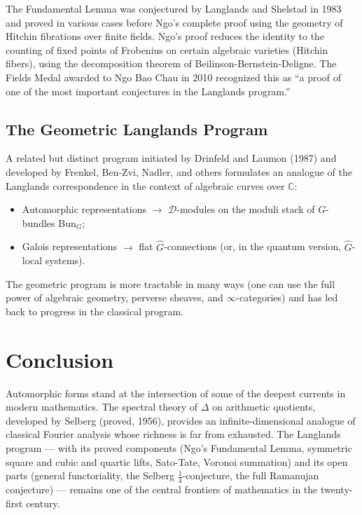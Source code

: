 \documentclass[12pt,a4paper]{amsart}
\theoremstyle{definition}
\newcommand{\CC}{\mathbb{C}}
\begin{document}
The Fundamental Lemma was conjectured by Langlands and Shelstad in 1983 and proved
in various cases before Ngo's complete proof using the geometry of Hitchin fibrations
over finite fields. Ngo's proof reduces the identity to the counting of fixed points
of Frobenius on certain algebraic varieties (Hitchin fibers), using the decomposition
theorem of Beilinson-Bernstein-Deligne. The Fields Medal awarded to Ngo Bao Chau
in 2010 recognized this as ``a proof of one of the most important conjectures in the
Langlands program.''

\subsection{The Geometric Langlands Program}

A related but distinct program initiated by Drinfeld and Laumon (1987) and
developed by Frenkel, Ben-Zvi, Nadler, and others formulates an analogue of the
Langlands correspondence in the context of algebraic curves over $\CC$:
\begin{itemize}
\item Automorphic representations $\to$ $\mathcal{D}$-modules on the moduli stack
  of $G$-bundles $\mathrm{Bun}_G$;
\item Galois representations $\to$ flat $\hat{G}$-connections (or, in the quantum
  version, $\hat{G}$-local systems).
\end{itemize}
The geometric program is more tractable in many ways (one can use the full power
of algebraic geometry, perverse sheaves, and $\infty$-categories) and has led back
to progress in the classical program.

\section*{Conclusion}

Automorphic forms stand at the intersection of some of the deepest currents in
modern mathematics. The spectral theory of $\Delta$ on arithmetic quotients, developed
by Selberg (proved, 1956), provides an infinite-dimensional analogue of classical
Fourier analysis whose richness is far from exhausted. The Langlands program — with
its proved components (Ngo's Fundamental Lemma, symmetric square and cubic and quartic
lifts, Sato-Tate, Voronoi summation) and its open parts (general functoriality,
the Selberg $\frac{1}{4}$-conjecture, the full Ramanujan conjecture) — remains one
of the central frontiers of mathematics in the twenty-first century.
\end{document}

